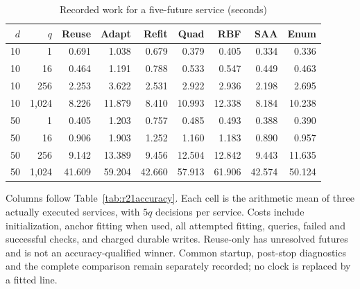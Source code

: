 \begin{table}[htbp]\centering\small
\caption{Recorded work for a five-future service (seconds)}\label{tab:r21cost}
\begin{tabular}{rrrrrrrrr}\toprule
$d$ & $q$ & Reuse & Adapt & Refit & Quad & RBF & SAA & Enum\\ \midrule
10 & 1 & 0.691 & 1.038 & 0.679 & 0.379 & 0.405 & 0.334 & 0.336\\
10 & 16 & 0.464 & 1.191 & 0.788 & 0.533 & 0.547 & 0.449 & 0.463\\
10 & 256 & 2.253 & 3.622 & 2.531 & 2.922 & 2.936 & 2.198 & 2.695\\
10 & 1,024 & 8.226 & 11.879 & 8.410 & 10.993 & 12.338 & 8.184 & 10.238\\
50 & 1 & 0.405 & 1.203 & 0.757 & 0.485 & 0.493 & 0.388 & 0.390\\
50 & 16 & 0.906 & 1.903 & 1.252 & 1.160 & 1.183 & 0.890 & 0.957\\
50 & 256 & 9.142 & 13.389 & 9.456 & 12.504 & 12.842 & 9.443 & 11.635\\
50 & 1,024 & 41.609 & 59.204 & 42.660 & 57.913 & 61.906 & 42.574 & 50.124\\
\bottomrule\end{tabular}
\par\smallskip\begin{minipage}{.98\textwidth}\footnotesize Columns follow Table~\ref{tab:r21accuracy}. Each cell is the arithmetic mean of three actually executed services, with $5q$ decisions per service. Costs include initialization, anchor fitting when used, all attempted fitting, queries, failed and successful checks, and charged durable writes. Reuse-only has unresolved futures and is not an accuracy-qualified winner. Common startup, post-stop diagnostics and the complete comparison remain separately recorded; no clock is replaced by a fitted line.\end{minipage}
\end{table}
